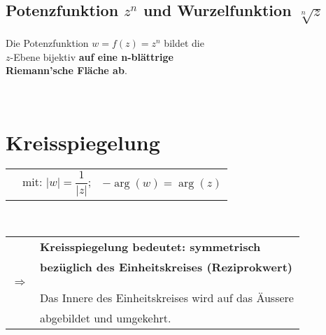 	\subsection{Potenzfunktion $z^n$ und Wurzelfunktion $\sqrt[n]{z}$}
		\begin{minipage}[t]{0.5\textwidth}
			\begin{framed}
				Die Potenzfunktion $w = f\left( z \right) = z^n$ bildet die\\[3pt]
				$z$-Ebene bijektiv \textbf{auf eine n-blättrige\\[3pt] Riemann'sche Fläche ab}.
			\end{framed}
		\end{minipage}
		\begin{minipage}[t]{0.5\textwidth}
			
		\end{minipage}\\[3pt]
	
\section{Kreisspiegelung}
	\begin{minipage}[]{0.5\textwidth}
		\begin{tabular}{lll}
			\fbox{$w = \overline{f}\left( z \right) = \dfrac{1}{\overline{z}}$} &
			mit: $|w| = \dfrac{1}{\left| z \right|}$; &
			$-\operatorname{arg}\left( w \right) = \operatorname{arg}\left( z \right)$\\[3pt]
		\end{tabular}\\[3pt]
		\begin{tabular}{ll}
			 & \textbf{Kreisspiegelung bedeutet: symmetrisch}\\[3pt]
			 & \textbf{bezüglich des Einheitskreises (Reziprokwert)}\\[0.5mm]
			$\Rightarrow$ & \\[0.5mm]
			 & Das Innere des Einheitskreises wird auf das Äussere\\[3pt]
			 & abgebildet und umgekehrt.\\[3pt]
		\end{tabular}
	\end{minipage}
	\begin{minipage}[]{0.5\textwidth}
		\scalebox{0.5}{}
	\end{minipage}\\[3pt]


